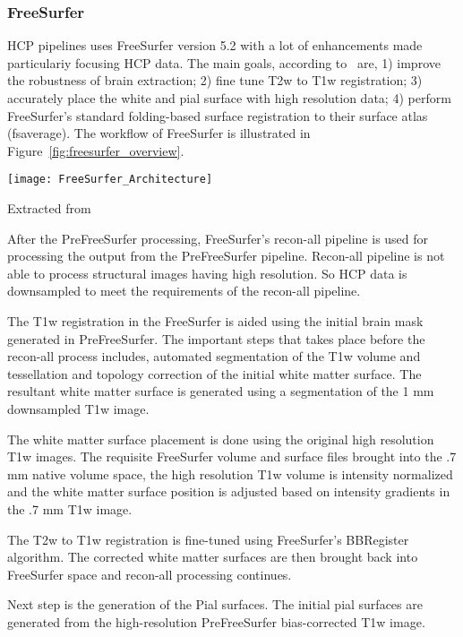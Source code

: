 \subsubsection{FreeSurfer}
HCP pipelines uses FreeSurfer version 5.2 with a lot of enhancements made particulariy focusing HCP data. The main goals, according to~\cite{Gla13} are, 1) improve the robustness of brain extraction; 2) fine tune T2w to T1w registration; 3) accurately place the white and pial surface with high resolution data; 4) perform FreeSurfer's standard folding-based surface registration to their surface atlas (fsaverage). The workflow of FreeSurfer is illustrated in Figure~\ref{fig:freesurfer_overview}.

\begin{center}
  \texttt{[image: FreeSurfer\_Architecture]}
  \label{fig:freesurfer_overview}
  \caption*{Extracted from \cite{Gla13}}
\end{center}

After the PreFreeSurfer processing, FreeSurfer's recon-all pipeline is used for processing the output from the PreFreeSurfer pipeline. Recon-all pipeline is not able to process structural images having high resolution. So HCP data is downsampled to meet the requirements of the recon-all pipeline.

The T1w registration in the FreeSurfer is aided using the initial brain mask generated in PreFreeSurfer. The important steps that takes place before the recon-all process includes, automated segmentation of the T1w volume and tessellation and topology correction of the initial white matter surface. The resultant white matter surface is generated using a segmentation of the 1 mm downsampled T1w image.

The white matter surface placement is done using the original high resolution T1w images. The requisite FreeSurfer volume and surface files brought into the .7 mm native volume space, the high resolution T1w volume is intensity normalized and the white matter surface position is adjusted based on intensity gradients in the .7 mm T1w image.

The T2w to T1w registration is fine-tuned using FreeSurfer's BBRegister algorithm. The corrected white matter surfaces are then brought back into FreeSurfer space and recon-all processing continues.

Next step is the generation of the Pial surfaces. The initial pial surfaces are generated from the high-resolution PreFreeSurfer bias-corrected T1w image.

